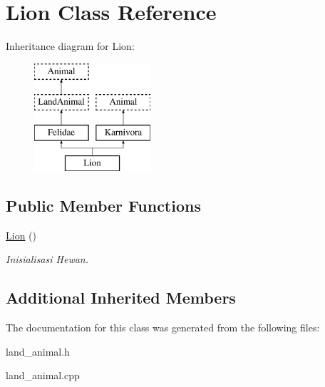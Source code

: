 \hypertarget{class_lion}{}\section{Lion Class Reference}
\label{class_lion}
Inheritance diagram for Lion\+:\begin{figure}[H]
\begin{center}
\leavevmode
\includegraphics[height=4.000000cm]{class_lion}
\end{center}
\end{figure}
\subsection*{Public Member Functions}
\begin{DoxyCompactItemize}
\item 
\hyperlink{class_lion_a582202364024a9ce10e57f47c872dbc2}{Lion} ()\hypertarget{class_lion_a582202364024a9ce10e57f47c872dbc2}{}\label{class_lion_a582202364024a9ce10e57f47c872dbc2}

\begin{DoxyCompactList}\small\item\em Inisialisasi Hewan. \end{DoxyCompactList}\end{DoxyCompactItemize}
\subsection*{Additional Inherited Members}


The documentation for this class was generated from the following files\+:\begin{DoxyCompactItemize}
\item 
land\+\_\+animal.\+h\item 
land\+\_\+animal.\+cpp\end{DoxyCompactItemize}
